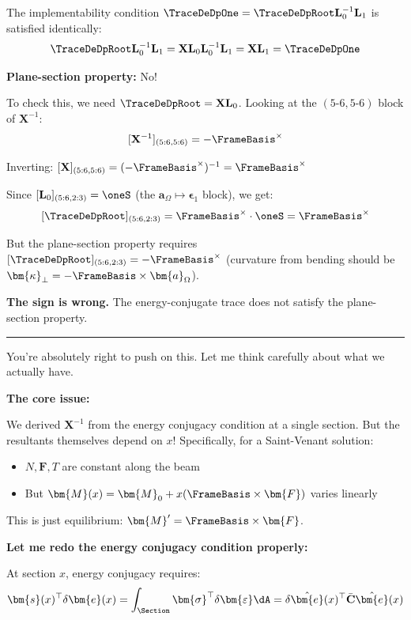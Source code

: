 The implementability condition
\(\TraceDeDpOne = \TraceDeDpRoot\mathbf{L}_0^{-1}\mathbf{L}_1\) is
satisfied identically:
\[\TraceDeDpRoot\mathbf{L}_0^{-1}\mathbf{L}_1 = \mathbf{X}\mathbf{L}_0\mathbf{L}_0^{-1}\mathbf{L}_1 = \mathbf{X}\mathbf{L}_1 = \TraceDeDpOne\]


\textbf{Plane-section property:} No!

To check this, we need \(\TraceDeDpRoot = \mathbf{X}\mathbf{L}_0\).
Looking at the \((5\text{-}6, 5\text{-}6)\) block of
\(\mathbf{X}^{-1}\):
\[[\mathbf{X}^{-1}]_{(5:6, 5:6)} = -\FrameBasis^\times\]

Inverting:
\([\mathbf{X}]_{(5:6, 5:6)} = (-\FrameBasis^\times)^{-1} = \FrameBasis^\times\)

Since \([\mathbf{L}_0]_{(5:6, 2:3)} = \oneS\) (the
\(\bm{a}_\Omega \mapsto \bm{\epsilon}_1\) block), we get:
\[[\TraceDeDpRoot]_{(5:6, 2:3)} = \FrameBasis^\times \cdot \oneS = \FrameBasis^\times\]

But the plane-section property requires
\([\TraceDeDpRoot]_{(5:6, 2:3)} = -\FrameBasis^\times\) (curvature from
bending should be
\(\bm{\kappa}_\perp = -\FrameBasis \times \bm{a}_\Omega\)).

\textbf{The sign is wrong.} The energy-conjugate trace does not satisfy
the plane-section property.

\begin{center}\rule{0.5\linewidth}{0.5pt}\end{center}


You're absolutely right to push on this. Let me think carefully about
what we actually have.

\textbf{The core issue:}

We derived \(\mathbf{X}^{-1}\) from the energy conjugacy condition at a
single section. But the resultants themselves depend on \(x\)!
Specifically, for a Saint-Venant solution:

\begin{itemize}
\tightlist
\item
  \(N, \bm{F}, T\) are constant along the beam
\item
  But \(\bm{M}(x) = \bm{M}_0 + x(\FrameBasis \times \bm{F})\) varies
  linearly
\end{itemize}

This is just equilibrium: \(\bm{M}' = \FrameBasis \times \bm{F}\).

\textbf{Let me redo the energy conjugacy condition properly:}

At section \(x\), energy conjugacy requires:
\[\bm{s}(x)^\top \delta\bm{e}(x) = \int_\Section \bm{\sigma}^\top \delta\bm{\varepsilon} \dA = \delta\hat{\bm{e}}(x)^\top \bar{\mathbf{C}} \hat{\bm{e}}(x)\]

